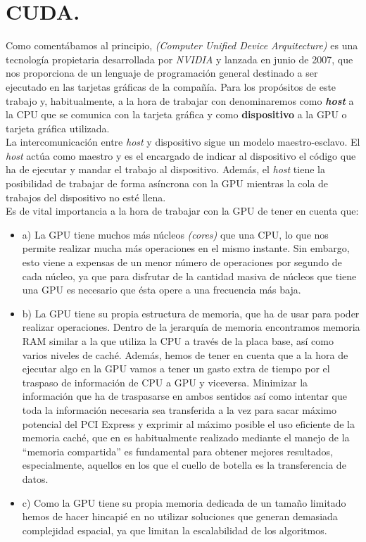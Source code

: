 \section{CUDA.}
Como comentábamos al principio, \cuda \textit{(Computer Unified Device Arquitecture)} \cite{cuda} es una tecnología propietaria desarrollada por \textit{NVIDIA} y lanzada en junio de 2007, que nos proporciona de un lenguaje de programación general destinado a ser ejecutado en las tarjetas gráficas de la compañía. Para los propósitos de este trabajo y, habitualmente, a la hora de trabajar con \cuda denominaremos como \textbf{\textit{host}} a la CPU que se comunica con la tarjeta gráfica y como \textbf{dispositivo} a la GPU o tarjeta gráfica utilizada. \\

La intercomunicación entre \textit{host} y dispositivo sigue un modelo maestro-esclavo. El \textit{host} actúa como maestro y es el encargado de indicar al dispositivo el código que ha de ejecutar y mandar el trabajo al dispositivo. Además, el \textit{host} tiene la posibilidad de trabajar de forma asíncrona con la GPU mientras la cola de trabajos del dispositivo no esté llena.\\

Es de vital importancia a la hora de trabajar con la GPU de tener en cuenta que:\\
\begin{itemize}
    \item a) La GPU tiene muchos más núcleos \textit{(cores)} que una CPU, lo que nos permite realizar mucha más operaciones en el mismo instante. Sin embargo, esto viene a expensas de un menor número de operaciones por segundo de cada núcleo, ya que para disfrutar de la cantidad masiva de núcleos que tiene una GPU es necesario que ésta opere a una frecuencia más baja.

    \item b) La GPU tiene su propia estructura de memoria, que ha de usar para poder realizar operaciones. Dentro de la jerarquía de memoria encontramos memoria RAM similar a la que utiliza la CPU a través de la placa base, así como varios niveles de caché. Además, hemos de tener en cuenta que a la hora de ejecutar algo en la GPU vamos a tener un gasto extra de tiempo por el traspaso de información de CPU a GPU y viceversa. Minimizar la información que ha de traspasarse en ambos sentidos así como intentar que toda la información necesaria sea transferida a la vez para sacar máximo potencial del PCI Express y exprimir al máximo posible el uso eficiente de la memoria caché, que en \cuda es habitualmente realizado mediante el manejo de la ``memoria compartida'' es fundamental para obtener mejores resultados, especialmente, aquellos en los que el cuello de botella es la transferencia de datos.

    \item c) Como la GPU tiene su propia memoria dedicada de un tamaño limitado hemos de hacer hincapié en no utilizar soluciones que generan demasiada complejidad espacial, ya que limitan la escalabilidad de los algoritmos.
\end{itemize}

